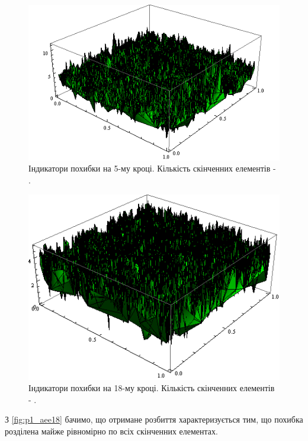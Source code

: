 \begin{figure}[H]
	\centering
    \includegraphics[scale=0.85]{problem1/my/AEE/5}
    \caption{Індикатори похибки на 5-му кроці. Кількість скінченних елементів - .}
    \label{fig:p1_aee5}
\end{figure}

\begin{figure}[H]
	\centering
    \includegraphics[scale=0.85]{problem1/my/AEE/18}
    \caption{Індикатори похибки на 18-му кроці. Кількість скінченних елементів - .}
    \label{fig:p1_aee18}
\end{figure}

З \autoref{fig:p1_aee18} бачимо, що отримане розбиття характеризується тим, що похибка розділена майже рівномірно по всіх скінченних елементах.

